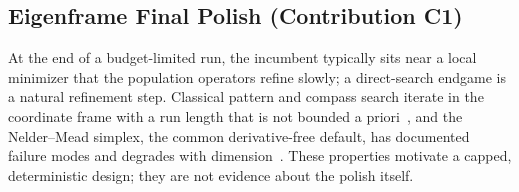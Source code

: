 \subsection{Eigenframe Final Polish (Contribution C1)}\label{sec:alg:polish}

At the end of a budget-limited run, the incumbent typically sits near
a local minimizer that the population operators refine slowly; a
direct-search endgame is a natural refinement step.
Classical pattern and compass search iterate in the coordinate frame
with a run length that is not bounded a
priori~\cite{kolda2003directsearch}, and the Nelder--Mead simplex, the
common derivative-free default, has documented failure modes and
degrades with
dimension~\cite{nelder1965simplex,kolda2003directsearch,gao2012implementing}.
These properties motivate a capped, deterministic design; they are not
evidence about the polish itself.

